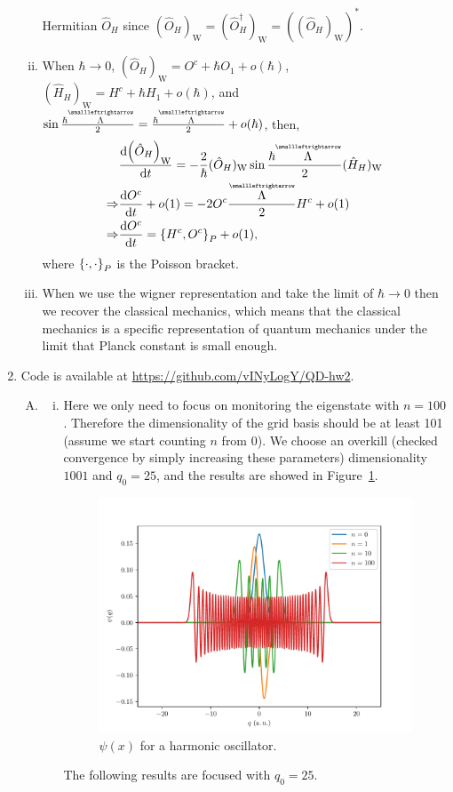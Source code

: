 \documentclass{article}
\newcommand{\tensor}[1]{\overset{\scriptscriptstyle\smallleftrightarrow}{#1}}
\begin{document}
\begin{enumerate}[1.]
\begin{enumerate}[(i)]
    Hermitian $\hat{O}_H$ since $(\hat{O}_H)_\mathrm{W} = (\hat{O}_H^\dagger)_\mathrm{W} = ((\hat{O}_H)_\mathrm{W})^*$.
    \item When $\hbar \to 0$, $(\hat{O}_H)_\mathrm{W} = O^c + \hbar O_1 + o(\hbar)$, $(\hat{H}_H)_\mathrm{W} = H^c + \hbar H_1 + o(\hbar)$, and $\sin {\frac{\hbar\tensor{\Lambda}}{2}} = \frac{\hbar\tensor{\Lambda}}{2} + o(\hbar)$, then,
    \begin{align*}
     & \dv{\qty(\hat{O}_H)_\mathrm{W}}{t} = -\frac{2}{\hbar}(\hat{O}_H)_\mathrm{W} \sin{\frac{\hbar\tensor{\Lambda}}{2}} (\hat{H}_H)_\mathrm{W}\\
     \Rightarrow & \dv{O^c}{t} + o(1) = -2O^c\frac{\tensor{\Lambda}}{2} H^c + o(1) \\
     \Rightarrow & \dv{O^c}{t} = \acomm{H^c}{O^c}_P + o(1),
    \end{align*} 
    where $\acomm{\cdot}{\cdot}_P$ is the Poisson bracket.
    \item When we use the wigner representation and take the limit of $\hbar \to 0$ then we recover the classical mechanics, which means that the classical mechanics is a specific representation of quantum mechanics under the limit that Planck constant is small enough.
  \end{enumerate}

  \item Code is available at \url{https://github.com/vINyLogY/QD-hw2}.
  \begin{enumerate}[(A)]
    \item
    \begin{enumerate}[(i)]
      \item Here we only need to focus on monitoring the eigenstate with $n = 100$. Therefore the dimensionality of the grid basis should be at least 101 (assume we start counting $n$ from $0$).  We choose an overkill (checked convergence by simply increasing these parameters) dimensionality $1001$ and $q_0 = 25$, and the results are showed in Figure~\ref{fig:q6a-1}.
      \begin{figure}[H]
        \centering
        \includegraphics[width=0.6\linewidth]{q6a-1.pdf}
        \caption{$\psi(x)$ for a harmonic oscillator.}
        \label{fig:q6a-1}
      \end{figure}
      The following results are focused with $q_0 = 25$.


\end{enumerate}
\end{enumerate}
\end{enumerate}
\end{document}
